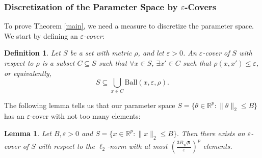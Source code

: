 \documentclass[11pt]{article}
\newtheorem{lemma}[theorem]{Lemma}
\newtheorem{definition}[theorem]{Definition}
\newcommand{\R}{\mathbb{R}}
\renewcommand{\epsilon}{\varepsilon}
\begin{document}
\subsubsection{Discretization of the Parameter Space by $\epsilon$-Covers}
To prove Theorem \ref{main}, we need a measure to discretize the parameter space. We start by defining an \emph{$\epsilon$-cover}:

\begin{definition}
Let $S$ be a set with metric $\rho$, and let $\epsilon>0$. An \emph{$\epsilon$-cover} of $S$ with respect to $\rho$ is a subset $C \subseteq S$ such that $\forall x \in S$, $\exists x' \in C$ such that $\rho(x,x') \le \epsilon$, or equivalently,
$$ S \subseteq \bigcup_{x \in C} \mathrm{Ball}(x, \epsilon, \rho). $$
\end{definition}

The following lemma tells us that our parameter space $S = \{\theta \in \R^p: \|\theta\|_2 \le B\}$ has an $\epsilon$-cover with not too many elements:

\begin{lemma}\label{ECSize}
Let $B,\epsilon>0$ and $S = \{x \in \R^p: \|x\|_2 \le B\}.$ Then there exists an $\epsilon$-cover of $S$ with respect to the $\ell_2$-norm with at most $\left(\frac{3B\sqrt{p}}{\epsilon}\right)^p$ elements.
\end{lemma}
\end{document}
